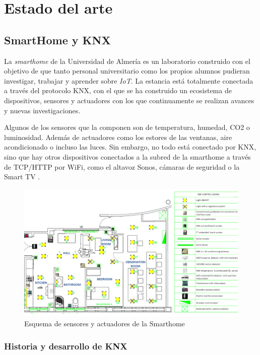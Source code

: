 \chapter{Estado del arte}

\section{SmartHome y KNX}

La \textit{smarthome} de la Universidad de Almería es un laboratorio construido con el objetivo de que tanto personal universitario como los propios alumnos pudieran investigar, trabajar y aprender sobre \textit{IoT}. La estancia está totalmente conectada a través del protocolo KNX, con el que se ha construido un ecosistema de dispositivos, sensores y actuadores con los que continuamente se realizan avances y nuevas investigaciones.

Algunos de los sensores que la componen son de temperatura, humedad, CO2 o luminosidad. Además de actuadores como los estores de las ventanas, aire acondicionado o incluso las luces. Sin embargo, no todo está conectado por KNX, sino que hay otros dispositivos conectados a la subred de la smarthome a través de TCP/HTTP por WiFi, como el altavoz Sonos, cámaras de seguridad o la Smart TV \cite{intro_4}.

\begin{figure}
    \centering
    \includegraphics{imagenes/capitulo1/mapaSmarthome.png}
    \caption{Esquema de sensores y actuadores de la Smarthome}
    \label{fig:mapa_sensores}
\end{figure}

\subsection{Historia y desarrollo de KNX}

